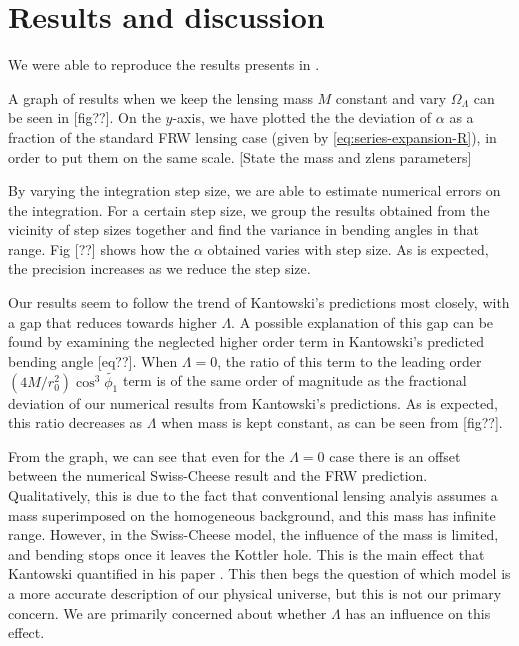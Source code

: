 \chapter{Results and discussion}
\label{chapter:results}

We were able to reproduce the results presents in \citet{schucker2009strong}. 

A graph of results when we keep the lensing mass $M$ constant and vary $\Omega_{\Lambda}$ can be seen in [fig??]. On the $y$-axis, we have plotted the the deviation of $\alpha$ as a fraction of the standard FRW lensing case (given by \autoref{eq:series-expansion-R}), in order to put them on the same scale. [State the mass and zlens parameters] 

By varying the integration step size, we are able to estimate numerical errors on the integration. For a certain step size, we group the results obtained from the vicinity of step sizes together and find the variance in bending angles in that range. Fig [??] shows how the $\alpha$ obtained varies with step size. As is expected, the precision increases as we reduce the step size. 

Our results seem to follow the trend of Kantowski's predictions most closely, with a gap that reduces towards higher $\Lambda$. A possible explanation of this gap can be found by examining the neglected higher order term in Kantowski's predicted bending angle [eq??]. When $\Lambda = 0$, the ratio of this term to the leading order $(4M/r_0^2) \cos^3 \tilde{\phi_1}$ term is of the same order of magnitude as the fractional deviation of our numerical results from Kantowski's predictions. As is expected, this ratio decreases as $\Lambda$ when mass is kept constant, as can be seen from [fig??]. 

From the graph, we can see that even for the $\Lambda = 0$ case there is an offset between the numerical Swiss-Cheese result and the FRW prediction. Qualitatively, this is due to the fact that conventional lensing analyis assumes a mass superimposed on the homogeneous background, and this mass has infinite range. However, in the Swiss-Cheese model, the influence of the mass is limited, and bending stops once it leaves the Kottler hole. This is the main effect that Kantowski quantified in his paper \citet{kantowski2010gravitational}. This then begs the question of which model is a more accurate description of our physical universe, but this is not our primary concern. We are primarily concerned about whether $\Lambda$ has an influence on this effect. 

